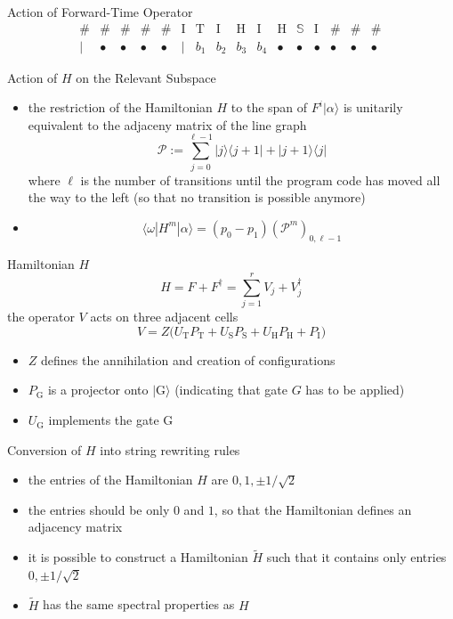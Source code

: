 \documentclass[slideColor]{prosper}
\newcommand{\cP}{{\mathcal{P}}}
\renewcommand{\>}{\rangle}
\newcommand{\<}{\langle}
\newcommand{\I}{\mathrm{I}}
\renewcommand{\H}{\mathrm{H}}
\renewcommand{\S}{\mathrm{S}}
\newcommand{\T}{\mathrm{T}}
\newcommand{\G}{\mathrm{G}}
\newcommand{\bS}{\mathbb{S}}
\begin{document}

\begin{slide}{Action of Forward-Time Operator}
\[
\begin{array}{cccccccccccccccccc}
\#   &\#      &\#      &\#      &\#      &\I      & \T  & \I  &\H      &\I      &\H      &\bS      &\I   &\# &\#     &\#  \\
\mid &\bullet &\bullet &\bullet &\bullet &\mid    & b_1 & b_2 & b_3 & b_4    &\bullet &\bullet &\bullet &\bullet &\bullet &\bullet
\end{array}\,
\]
\end{slide}


\begin{slide}{Action of $H$ on the Relevant Subspace}
\begin{itemize}
\item the restriction of the Hamiltonian $H$ to the span of $F^i|\alpha\>$ is unitarily equivalent to the adjaceny matrix of the line graph
\[
\cP:=\sum_{j=0}^{\ell-1} |j\>\<j+1| + |j+1\>\<j|
\]
where $\ell$ is the number of transitions until the program code has moved all the way to the left (so that no transition is possible anymore)
\item 
\[
\<\omega|H^m|\alpha\>=(p_0 - p_1) (\cP^m)_{0,\ell-1}
\]
\end{itemize}
\end{slide}


\begin{slide}{Hamiltonian $H$}
\[
H = F + F^\dagger = \sum_{j=1}^r V_j + V_j^\dagger
\]
the operator $V$ acts on three adjacent cells
\[
V = Z \big( U_\T P_\T + U_\S P_\S + U_\H P_\H + P_\I \big)
\]
\begin{itemize}
\item $Z$ defines the annihilation and creation of configurations 
\item $P_\G$ is a projector onto $|\G\>$ (indicating that gate $G$ has to be applied)
\item $U_\G$ implements the gate $\G$
\end{itemize}
\end{slide}


\begin{slide}{Conversion of $H$ into string rewriting rules}
\begin{itemize}
\item the entries of the Hamiltonian $H$ are $0,1,\pm 1/\sqrt{2}$
\item the entries should be only $0$ and $1$, so that the Hamiltonian defines an adjacency matrix
\item it is possible to construct a Hamiltonian $\tilde{H}$ such that it contains only entries $0,\pm 1/\sqrt{2}$
\item $\tilde{H}$ has the same spectral properties as $H$
\end{itemize}
\end{slide}
\end{document}
